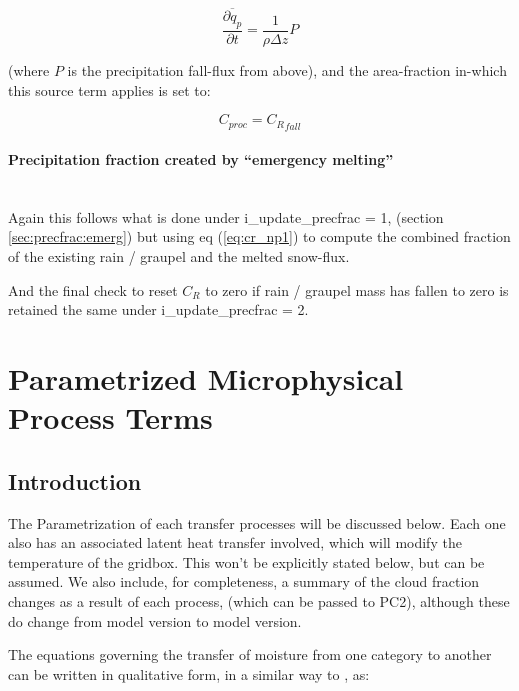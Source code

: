 \documentclass{UMDP_article}
\begin{document}
\[
\overline{\frac{\partial q_p}{\partial t}} = \frac{1}{\rho \Delta z} P
\]

(where $P$ is the precipitation fall-flux from above),
and the area-fraction in-which this source term applies is set to:

\[
C_{proc} = {C_R}_{fall}
\]

\paragraph{Precipitation fraction created by ``emergency melting''}
~\\

Again this follows what is done under i\_update\_precfrac = 1,
(section \ref{sec:precfrac:emerg}) but using eq (\ref{eq:cr_np1})
to compute the combined fraction of the existing rain / graupel
and the melted snow-flux.

And the final check to reset $C_R$ to zero if rain / graupel mass
has fallen to zero is retained the same under i\_update\_precfrac = 2.


\newpage



\section{Parametrized Microphysical Process Terms}

\subsection{Introduction}
\label{sec:trans_intro}

The Parametrization of each transfer processes will be discussed below.
Each one also has an associated latent heat transfer involved, which will
modify the temperature of the gridbox. This won't be explicitly stated below,
but can be assumed. We also include, for completeness, a summary of the
cloud fraction changes as a result of each process, (which can be 
passed to PC2), although these
do change from model version to model version.

The equations governing the transfer of moisture from one category to another
can be written in qualitative form, in a similar way to 
\cite{Rutledge:Hobbs:1983}, as:
\end{document}
